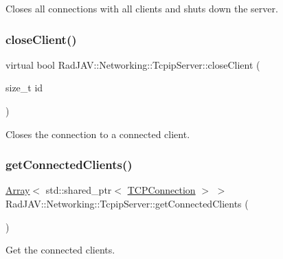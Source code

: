 Closes all connections with all clients and shuts down the server. 

\mbox{\label{class_rad_j_a_v_1_1_networking_1_1_tcpip_server_ada8defc3c9feb91b64371199eac4787c}} 
\subsubsection{\texorpdfstring{close\+Client()}{closeClient()}}
{\footnotesize\ttfamily virtual bool Rad\+J\+A\+V\+::\+Networking\+::\+Tcpip\+Server\+::close\+Client (\begin{DoxyParamCaption}\item[{size\+\_\+t}]{id }\end{DoxyParamCaption})\hspace{0.3cm}{\ttfamily [pure virtual]}}



Closes the connection to a connected client. 

\mbox{\label{class_rad_j_a_v_1_1_networking_1_1_tcpip_server_a3c8ddbb801687824fd36a283d0b179c8}} 
\subsubsection{\texorpdfstring{get\+Connected\+Clients()}{getConnectedClients()}}
{\footnotesize\ttfamily \mbox{\hyperlink{class_rad_j_a_v_1_1_array}{Array}}$<$ std\+::shared\+\_\+ptr$<$ \mbox{\hyperlink{class_rad_j_a_v_1_1_networking_1_1_t_c_p_connection}{T\+C\+P\+Connection}} $>$ $>$ Rad\+J\+A\+V\+::\+Networking\+::\+Tcpip\+Server\+::get\+Connected\+Clients (\begin{DoxyParamCaption}{ }\end{DoxyParamCaption})}



Get the connected clients. 

